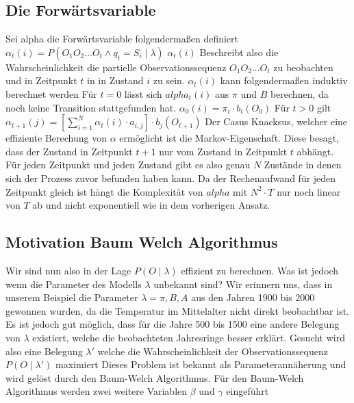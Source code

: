 \subsection*{Die Forwärtsvariable}
Sei alpha die Forwärtsvariable folgendermaßen definiert
$\alpha_t(i) = P(O_1 O_2 \dots O_t \wedge q_t = S_i \mid \lambda)$
$\alpha_t(i)$ Beschreibt also die Wahrscheinlichkeit die partielle Observationssequenz
$O_1 O_2 \dots O_t$ zu beobachten und in Zeitpunkt $t$ in in Zustand $i$ zu sein.
$\alpha_t(i)$ kann folgendermaßen induktiv berechnet werden
Für $t=0$ lässt sich $alpha_t(i)$ aus $\pi$ und $B$ berechnen, da noch keine Transition 
stattgefunden hat. 
$\alpha_0(i) = \pi_i \cdot b_i(O_0)$
Für $t>0$ gilt
$\alpha_{t+1}(j) = \left[ \sum_{i=1}^{N} \alpha_t(i) \cdot a_{i,j} \right] \cdot b_j(O_{t+1})$
Der Casus Knacksus, welcher eine effiziente Berechung von $\alpha$ ermöglicht ist die Markov-Eigenschaft.
Diese besagt, dass der Zustand in Zeitpunkt $t+1$ nur vom Zustand in Zeitpunkt $t$ abhängt.
Für jeden Zeitpunkt und jeden Zustand gibt es also genau $N$ Zustände in denen sich
der Prozess zuvor befunden haben kann. Da der Rechenaufwand für jeden Zeitpunkt gleich ist hängt die Komplexität von
$alpha$ mit $N^2 \cdot T$ nur noch linear von $T$ ab und nicht exponentiell wie in dem vorherigen Ansatz.

\subsection*{Motivation Baum Welch Algorithmus}
Wir sind nun also in der Lage $P(O \mid \lambda)$ effizient zu berechnen. Was ist jedoch wenn die Parameter des Modells $\lambda$
unbekannt sind? Wir erinnern uns, dass in unserem Beispiel die Parameter $\lambda = \pi, B, A$ aus den Jahren 1900 bis 2000
gewonnen wurden, da die Temperatur im Mittelalter nicht direkt beobachtbar ist. Es ist jedoch gut möglich, dass 
für die Jahre 500 bis 1500 eine andere Belegung von $\lambda$ existiert, welche die beobachteten Jahresringe besser erklärt.
Gesucht wird also eine Belegung $\lambda'$ welche die Wahrscheinlichkeit der Observationssequenz $P(O \mid \lambda')$ maximiert
Dieses Problem ist bekannt als Parameterannäherung und wird gelöst durch den Baum-Welch Algorithmus.
Für den Baum-Welch Algorithmus werden zwei weitere Variablen $\beta$ und $\gamma$ eingeführt

